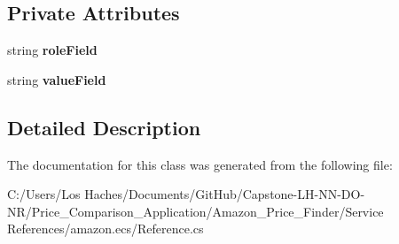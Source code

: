 \subsection*{Private Attributes}
\begin{DoxyCompactItemize}
\item 
\hypertarget{class_price___comparison_1_1amazon_1_1ecs_1_1_item_attributes_creator_ab3849c9cb4034b9062e7095c96fb10dd}{string {\bfseries role\-Field}}\label{class_price___comparison_1_1amazon_1_1ecs_1_1_item_attributes_creator_ab3849c9cb4034b9062e7095c96fb10dd}

\item 
\hypertarget{class_price___comparison_1_1amazon_1_1ecs_1_1_item_attributes_creator_a01dd6b7fb81086f37e474bf5fd5ee6e3}{string {\bfseries value\-Field}}\label{class_price___comparison_1_1amazon_1_1ecs_1_1_item_attributes_creator_a01dd6b7fb81086f37e474bf5fd5ee6e3}

\end{DoxyCompactItemize}


\subsection{Detailed Description}


The documentation for this class was generated from the following file\-:\begin{DoxyCompactItemize}
\item 
C\-:/\-Users/\-Los Haches/\-Documents/\-Git\-Hub/\-Capstone-\/\-L\-H-\/\-N\-N-\/\-D\-O-\/\-N\-R/\-Price\-\_\-\-Comparison\-\_\-\-Application/\-Amazon\-\_\-\-Price\-\_\-\-Finder/\-Service References/amazon.\-ecs/Reference.\-cs\end{DoxyCompactItemize}
